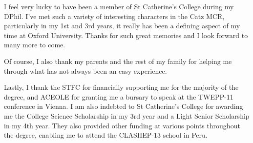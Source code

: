I feel very lucky to have been a member of St Catherine's College during my DPhil. I've met 
such a variety of interesting characters in the Catz MCR, particularly in my 1st and 3rd 
years, it really has been a defining aspect of my time at Oxford University. Thanks for such 
great memories and I look forward to many more to come.

Of course, I also thank my parents and the rest of my family for helping me through what has 
not always been an easy experience.

Lastly, I thank the STFC for financially supporting me for the majority of the degree, and 
ACEOLE for granting me a bursary to speak at the TWEPP-11 conference in Vienna. I am also 
indebted to St Catherine's College for awarding me the College Science Scholarship in my 3rd 
year and a Light Senior Scholarship in my 4th year. They also provided other funding at 
various points throughout the degree, \eg enabling me to attend the CLASHEP-13 school in Peru.
